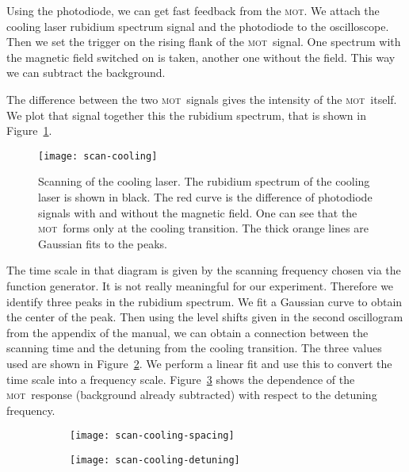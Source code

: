 \documentclass[11pt, english, fleqn, DIV=15, headinclude, BCOR=2cm]{scrreprt}
\newcommand\mot{\textsc{mot}}
\begin{document}
Using the photodiode, we can get fast feedback from the \mot. We attach the
cooling laser rubidium spectrum signal and the photodiode to the oscilloscope.
Then we set the trigger on the rising flank of the \mot\ signal. One spectrum
with the magnetic field switched on is taken, another one without the field.
This way we can subtract the background.

The difference between the two \mot\ signals gives the intensity of the \mot\
itself. We plot that signal together this the rubidium spectrum, that is shown
in Figure~\ref{fig:scan-cooling}.


\begin{figure}
    \centering
    \texttt{[image: scan-cooling]}
    \caption{%
        Scanning of the cooling laser. The rubidium spectrum of the cooling
        laser is shown in black. The red curve is the difference of photodiode
        signals with and without the magnetic field. One can see that the \mot\
        forms only at the cooling transition. The thick orange lines are
        Gaussian fits to the peaks.
    }
    \label{fig:scan-cooling}
\end{figure}

The time scale in that diagram is given by the scanning frequency chosen via
the function generator. It is not really meaningful for our experiment.
Therefore we identify three peaks in the rubidium spectrum. We fit a Gaussian
curve to obtain the center of the peak. Then using the level shifts given in
the second oscillogram from the appendix of the manual, we can obtain a
connection between the scanning time and the detuning from the cooling
transition. The three values used are shown in
Figure~\ref{fig:scan-cooling-spacing}. We perform a linear fit and use this to
convert the time scale into a frequency scale.
Figure~\ref{fig:scan-cooling-detuning} shows the dependence of the \mot\
response (background already subtracted) with respect to the detuning
frequency.

\begin{figure}
    \centering
    \begin{subfigure}[c]{0.48\linewidth}
        \centering
        \texttt{[image: scan-cooling-spacing]}
        \caption{%
            }
        \label{fig:scan-cooling-spacing}
    \end{subfigure}
    \hfill
    \begin{subfigure}[c]{0.48\linewidth}
        \centering
        \texttt{[image: scan-cooling-detuning]}
        \caption{%
            }
        \label{fig:scan-cooling-detuning}
    \end{subfigure}
    \caption{%
        }
    \label{fig:}
\end{figure}
\end{document}
